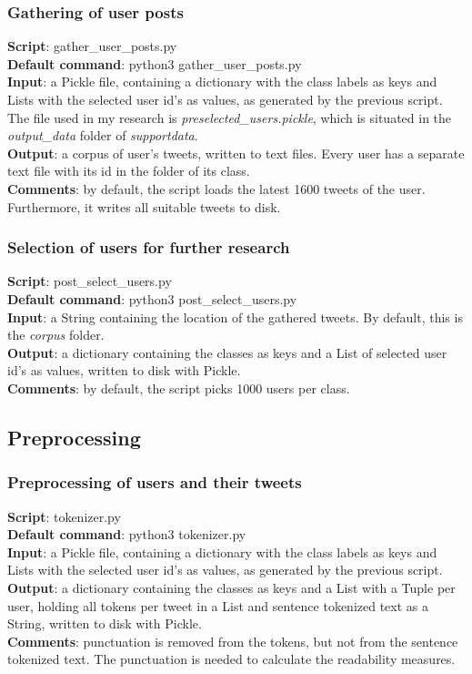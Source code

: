 \documentclass[
10pt, %
a4paper, %
oneside, %
headinclude,footinclude, %
] {book}%
\begin{document}
\subsubsection{Gathering of user posts}
\textbf{Script}:	gather\_user\_posts.py \\
\textbf{Default command}: python3 gather\_user\_posts.py \\
\textbf{Input}:  a Pickle file, containing a dictionary with the class labels as keys and Lists with the selected user id's as values, as generated by the previous script. The file used in my research is \textit{preselected\_users.pickle}, which is situated in the \textit{output\_data} folder of \textit{supportdata}. \\
\textbf{Output}:  a corpus of user's tweets, written to text files. Every user has a separate text file with its id in the folder of its class. \\
\textbf{Comments}: by default, the script loads the latest 1600 tweets of the user. Furthermore, it writes all suitable tweets to disk.

\subsubsection{Selection of users for further research}
\textbf{Script}:	post\_select\_users.py \\
\textbf{Default command}: python3 post\_select\_users.py \\
\textbf{Input}:  a String containing the location of the gathered tweets. By default, this is the \textit{corpus} folder. \\
\textbf{Output}:  a dictionary containing the classes as keys and a List of selected user id's as values, written to disk with Pickle. \\
\textbf{Comments}: by default, the script picks 1000 users per class.

\subsection{\textbf{Preprocessing}}
\subsubsection{Preprocessing of users and their tweets}
\textbf{Script}:	tokenizer.py \\
\textbf{Default command}: python3 tokenizer.py \\
\textbf{Input}:  a Pickle file, containing a dictionary with the class labels as keys and Lists with the selected user id's as values, as generated by the previous script.  \\
\textbf{Output}:  a dictionary containing the classes as keys and a List with a Tuple per user, holding all tokens per tweet in a List and sentence tokenized text as a String, written to disk with Pickle. \\
\textbf{Comments}: punctuation is removed from the tokens, but not from the sentence tokenized text. The punctuation is needed to calculate the readability measures.
\end{document}
